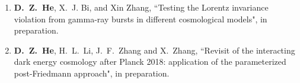   \begin{enumerate}[leftmargin=*]
    \item \textbf{D.~Z.~He}, X.~J. Bi, and Xin Zhang, ``Testing the Lorentz invariance violation from gamma-ray bursts in different cosmological models", in preparation.
      
    \item \textbf{D.~Z.~He}, H.~L.~Li, J.~F.~Zhang and X.~Zhang, ``Revisit of the interacting dark energy cosmology after Planck 2018: application of the parameterized post-Friedmann approach", in preparation.  
 

    
    \end{enumerate}
